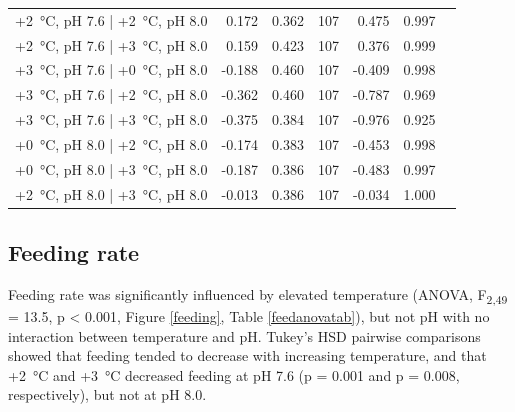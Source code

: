 \documentclass[a4paper,10pt, oneside]{memoir}
\begin{document}
\begin{table}[tb]
\begin{tabular}[t]{lrrrrrl}
\hspace{1em}+\SI{2}{\celsius}, pH 7.6 | +\SI{2}{\celsius}, pH 8.0 & 0.172 & 0.362 & 107 & 0.475 & 0.997 & \\
\hspace{1em}+\SI{2}{\celsius}, pH 7.6 | +\SI{3}{\celsius}, pH 8.0 & 0.159 & 0.423 & 107 & 0.376 & 0.999 & \\
\hspace{1em}+\SI{3}{\celsius}, pH 7.6 | +\SI{0}{\celsius}, pH 8.0 & -0.188 & 0.460 & 107 & -0.409 & 0.998 & \\
\hspace{1em}+\SI{3}{\celsius}, pH 7.6 | +\SI{2}{\celsius}, pH 8.0 & -0.362 & 0.460 & 107 & -0.787 & 0.969 & \\
\hspace{1em}+\SI{3}{\celsius}, pH 7.6 | +\SI{3}{\celsius}, pH 8.0 & -0.375 & 0.384 & 107 & -0.976 & 0.925 & \\
\hspace{1em}+\SI{0}{\celsius}, pH 8.0 | +\SI{2}{\celsius}, pH 8.0 & -0.174 & 0.383 & 107 & -0.453 & 0.998 & \\
\hspace{1em}+\SI{0}{\celsius}, pH 8.0 | +\SI{3}{\celsius}, pH 8.0 & -0.187 & 0.386 & 107 & -0.483 & 0.997 & \\
\hspace{1em}+\SI{2}{\celsius}, pH 8.0 | +\SI{3}{\celsius}, pH 8.0 & -0.013 & 0.386 & 107 & -0.034 & 1.000 & \\
\bottomrule
\end{tabular}
\end{table}

\hypertarget{feeding-rate}{%
\subsection{Feeding rate}\label{feeding-rate}}

Feeding rate was significantly influenced by elevated temperature (ANOVA, \si{F_{2,49}} = 13.5, p \textless{} 0.001, Figure \ref{feeding}, Table \ref{feedanovatab}), but not pH with no interaction between temperature and pH.
Tukey's HSD pairwise comparisons showed that feeding tended to decrease with increasing temperature, and that +\SI{2}{\celsius} and +\SI{3}{\celsius} decreased feeding at pH 7.6 (p = 0.001 and p = 0.008, respectively), but not at pH 8.0.
\end{document}
